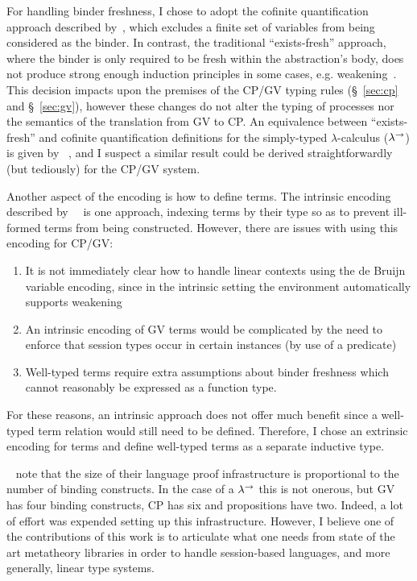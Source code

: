 For handling binder freshness, I chose to adopt the cofinite quantification
approach described by~\citeauthor{Aydemir:2008:EFM}, which excludes a finite
set of variables from being considered as the binder. In contrast, the
traditional ``exists-fresh'' approach, where the binder is only required to be
fresh within the abstraction's body, does not produce strong enough induction
principles in some cases, e.g. weakening~\cite{Aydemir:2008:EFM}. This
decision impacts upon the premises of the CP/GV typing rules (\S~\ref{sec:cp}
and \S~\ref{sec:gv}), however these changes do not alter the typing of
processes nor the semantics of the translation from GV to CP. An equivalence
between ``exists-fresh'' and cofinite quantification definitions for the
simply-typed $\lambda$-calculus ($\lambda^\rightarrow$) is given by
\citeauthor{Aydemir:2008:EFM}~\cite{Aydemir:2008:EFM}, and I suspect a similar
result could be derived straightforwardly (but tediously) for the CP/GV
system.

Another aspect of the encoding is how to define terms. The intrinsic encoding
described by~\citeauthor{Benton:2012:STT}~\cite{Benton:2012:STT} is one
approach, indexing terms by their type so as to prevent ill-formed terms from
being constructed. However, there are issues with using this encoding for
CP/GV:
\begin{enumerate}
\item It is not immediately clear how to handle linear contexts using the de
  Bruijn variable encoding, since in the intrinsic setting the environment
  automatically supports weakening
\item An intrinsic encoding of GV terms would be complicated by the need to
  enforce that session types occur in certain instances (by use of a
  predicate)
\item Well-typed terms require extra assumptions about binder freshness which
  cannot reasonably be expressed as a function type.
\end{enumerate}

For these reasons, an intrinsic approach does not offer much benefit since a
well-typed term relation would still need to be defined. Therefore, I chose an
extrinsic encoding for terms and define well-typed terms as a separate
inductive type.

\citeauthor{Aydemir:2008:EFM}~\cite{Aydemir:2008:EFM} note that the size of
their language proof infrastructure is proportional to the number of binding
constructs. In the case of a $\lambda^\rightarrow$ this is not onerous, but GV has four
binding constructs, CP has six and propositions have two. Indeed, a lot of
effort was expended setting up this infrastructure. However, I believe one of
the contributions of this work is to articulate what one needs from state of
the art metatheory libraries in order to handle session-based languages, and
more generally, linear type systems.

